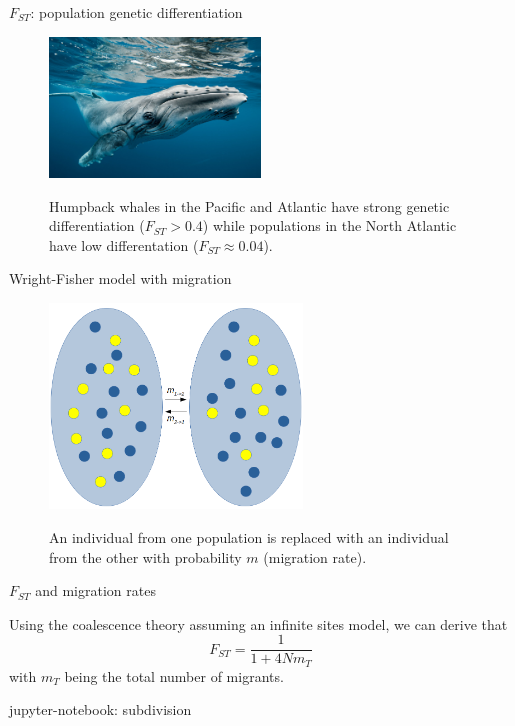 \begin{frame}{$F_{ST}$: population genetic differentiation}

	\begin{figure}
        	\includegraphics[width=0.5\textwidth]{Pics/whale} \
		\caption{\small Humpback whales in the Pacific and Atlantic have strong genetic differentiation ($F_{ST}>0.4$) while populations in the North Atlantic have low differentation  ($F_{ST} \approx 0.04$).}
        \end{figure}

\end{frame}


\begin{frame}{Wright-Fisher model with migration}

        \begin{figure}
                \includegraphics[width=0.6\textwidth]{Pics/migration} \
                \caption{\small An individual from one population is replaced with an individual from the other with probability $m$ (migration rate).}
        \end{figure}

\end{frame}


\begin{frame}{$F_{ST}$ and migration rates}

	Using the coalescence theory assuming an infinite sites model, we can derive that
	\begin{equation}
		F_{ST} = \frac{1}{1 + 4Nm_T}
	\end{equation}
	with $m_T$ being the total number of migrants.

	\bigskip
	\tiny jupyter-notebook: subdivision

\end{frame}


